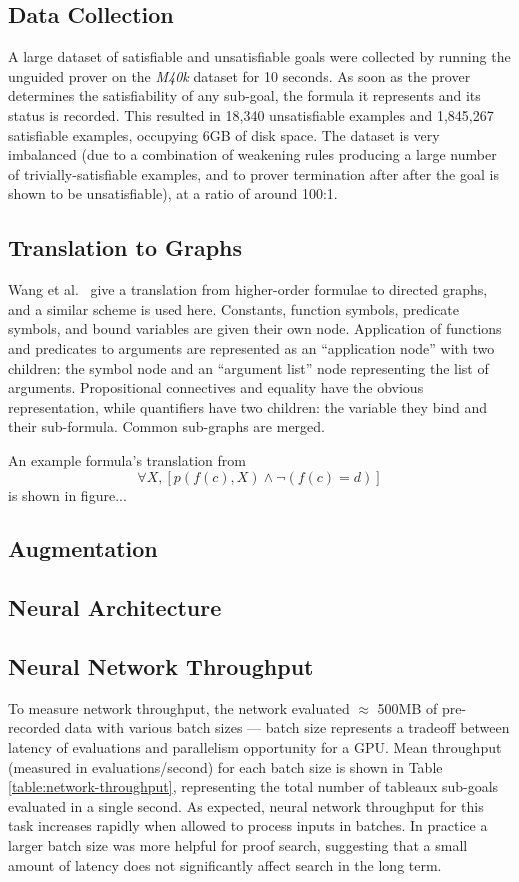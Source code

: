 \documentclass[runningheads]{llncs}
\newcommand{\mizarlarge}{\textit{M40k}}
\begin{document}
\subsection{Data Collection}
A large dataset of satisfiable and unsatisfiable goals were collected by running the unguided prover on the \mizarlarge{} dataset for 10 seconds.
As soon as the prover determines the satisfiability of any sub-goal, the formula it represents and its status is recorded.
This resulted in 18,340 unsatisfiable examples and 1,845,267 satisfiable examples, occupying 6GB of disk space.
The dataset is very imbalanced (due to a combination of weakening rules producing a large number of trivially-satisfiable examples, and to prover termination after after the goal is shown to be unsatisfiable), at a ratio of around 100:1.

\subsection{Translation to Graphs}
Wang et al.~\cite{formula-graph} give a translation from higher-order formulae to directed graphs, and a similar scheme is used here.
Constants, function symbols, predicate symbols, and bound variables are given their own node.
Application of functions and predicates to arguments are represented as an ``application node'' with two children: the symbol node and an ``argument list'' node representing the list of arguments.
Propositional connectives and equality have the obvious representation, while quantifiers have two children: the variable they bind and their sub-formula.
Common sub-graphs are merged.

An example formula's translation from
\[
	\forall X, \left[p\left(f(c), X\right) \wedge \lnot\left(f(c) = d\right)\right]
\]
is shown in figure...

\begin{figure}
\end{figure}

\subsection{Augmentation}
\subsection{Neural Architecture}

\subsection{Neural Network Throughput}
To measure network throughput, the network evaluated \(\approx\) 500MB of pre-recorded data with various batch sizes --- batch size represents a tradeoff between latency of evaluations and parallelism opportunity for a GPU.
Mean throughput (measured in evaluations/second) for each batch size is shown in Table \ref{table:network-throughput}, representing the total number of tableaux sub-goals evaluated in a single second.
As expected, neural network throughput for this task increases rapidly when allowed to process inputs in batches.
In practice a larger batch size was more helpful for proof search, suggesting that a small amount of latency does not significantly affect search in the long term.
\end{document}
